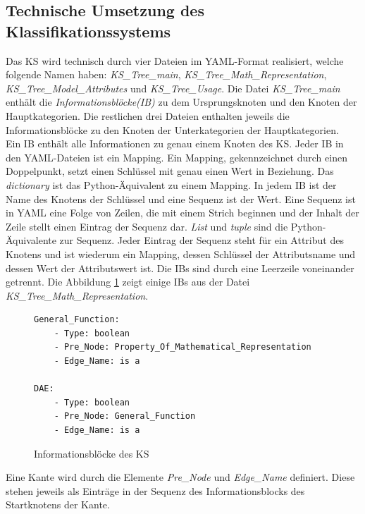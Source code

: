 \subsection{Technische Umsetzung des Klassifikationssystems}
\label{Ch:Ergebnisse:Sec:KS:SubSec:TechUmsetzung}
Das KS wird technisch durch vier Dateien im YAML-Format realisiert, welche folgende Namen haben: \textit{KS\_Tree\_main}, \textit{KS\_Tree\_Math\_Representation}, \textit{KS\_Tree\_Model\_Attributes} und \textit{KS\_Tree\_Usage}. Die Datei \textit{KS\_Tree\_main} enthält die \textit{Informationsblöcke(IB)} zu dem Ursprungsknoten und den Knoten der Hauptkategorien. Die restlichen drei Dateien enthalten jeweils die Informationsblöcke zu den Knoten der Unterkategorien der Hauptkategorien. \\ 
Ein IB enthält alle Informationen zu genau einem Knoten des KS. Jeder IB in den YAML-Dateien ist ein Mapping. Ein Mapping, gekennzeichnet durch einen Doppelpunkt, setzt einen Schlüssel mit genau einen Wert in Beziehung. Das \textit{dictionary} ist das Python-Äquivalent zu einem Mapping. In jedem IB ist der Name des Knotens der Schlüssel und eine Sequenz ist der Wert. Eine Sequenz ist in YAML eine Folge von Zeilen, die mit einem Strich beginnen und der Inhalt der Zeile stellt einen Eintrag der Sequenz dar. \textit{List} und \textit{tuple} sind die Python-Äquivalente zur Sequenz. Jeder Eintrag der Sequenz steht für ein Attribut des Knotens und ist wiederum ein Mapping, dessen Schlüssel der Attributsname und dessen Wert der Attributswert ist. Die IB\grq s sind durch eine Leerzeile voneinander getrennt. Die Abbildung \ref{fig:IBs} zeigt einige IB\grq s aus der Datei \textit{KS\_Tree\_Math\_Representation}.\\ 
\begin{figure}[b]
	\centering
	\begin{adjustbox}{padding=15pt 0pt 0pt 0pt, fbox}
	\begin{lstlisting}[basicstyle=\footnotesize]
General_Function:
	- Type: boolean
	- Pre_Node: Property_Of_Mathematical_Representation
	- Edge_Name: is a

DAE: 
	- Type: boolean
	- Pre_Node: General_Function
	- Edge_Name: is a
	\end{lstlisting}
	\end{adjustbox}
	\caption{Informationsblöcke des KS}
	\label{fig:IBs}
\end{figure}

Eine Kante wird durch die Elemente \textit{Pre\_Node} und \textit{Edge\_Name} definiert. Diese stehen jeweils als Einträge in der Sequenz des Informationsblocks des Startknotens der Kante.


